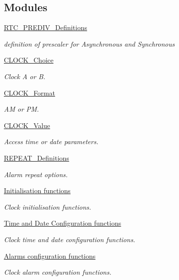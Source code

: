 \subsection*{Modules}
\begin{DoxyCompactItemize}
\item 
\hyperlink{group___r_t_c___p_r_e_d_i_v___definitions}{R\+T\+C\+\_\+\+P\+R\+E\+D\+I\+V\+\_\+\+Definitions}
\begin{DoxyCompactList}\small\item\em definition of prescaler for Asynchronous and Synchronous \end{DoxyCompactList}\item 
\hyperlink{group___c_l_o_c_k___choice}{C\+L\+O\+C\+K\+\_\+\+Choice}
\begin{DoxyCompactList}\small\item\em Clock A or B. \end{DoxyCompactList}\item 
\hyperlink{group___c_l_o_c_k___format}{C\+L\+O\+C\+K\+\_\+\+Format}
\begin{DoxyCompactList}\small\item\em AM or PM. \end{DoxyCompactList}\item 
\hyperlink{group___c_l_o_c_k___value}{C\+L\+O\+C\+K\+\_\+\+Value}
\begin{DoxyCompactList}\small\item\em Access time or date parameters. \end{DoxyCompactList}\item 
\hyperlink{group___r_e_p_e_a_t___definitions}{R\+E\+P\+E\+A\+T\+\_\+\+Definitions}
\begin{DoxyCompactList}\small\item\em Alarm repeat options. \end{DoxyCompactList}\item 
\hyperlink{group___clock___init}{Initialisation functions}
\begin{DoxyCompactList}\small\item\em Clock initialisation functions. \end{DoxyCompactList}\item 
\hyperlink{group___clock___time___date}{Time and Date Configuration functions}
\begin{DoxyCompactList}\small\item\em Clock time and date configuration functions. \end{DoxyCompactList}\item 
\hyperlink{group___clock___alarms}{Alarms configuration functions}
\begin{DoxyCompactList}\small\item\em Clock alarm configuration functions. \end{DoxyCompactList}\end{DoxyCompactItemize}
